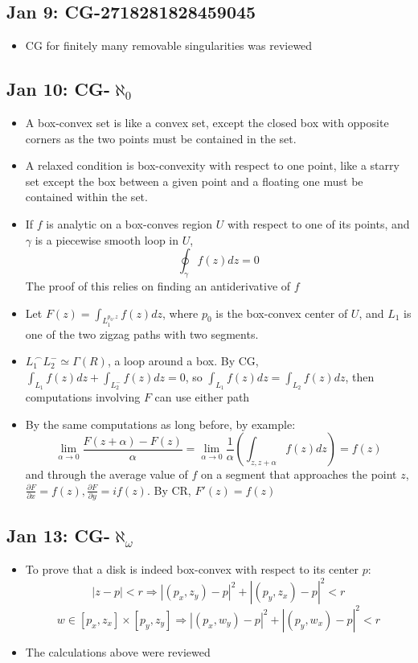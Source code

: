 \documentclass[10pt, oneside]{article}
\let\del\partial
\newcommand{\ltz}[1]{\lim_{#1 \rightarrow 0}}
\newcommand{\cat}{^{\,\smallfrown}}
\begin{document}
\subsection{Jan 9: CG-2718281828459045}
\begin{itemize}
    \item CG for finitely many removable singularities was reviewed
\end{itemize}

\subsection{Jan 10: CG-$\aleph_0$}
\begin{itemize}
    \item A box-convex set is like a convex set, except the closed box with opposite corners as the two points must be contained in the set.
    \item A relaxed condition is box-convexity with respect to one point, like a starry set except the box between a given point and a floating one must be contained within the set.
    \item If $f$ is analytic on a box-conves region $U$ with respect to one of its points, and $\gamma$ is a piecewise smooth loop in $U$,
        \[\oint_{\gamma} f(z) dz = 0\]
    The proof of this relies on finding an antiderivative of $f$
    \item Let $F(z) = \int_{L_1^{p_0,z}} f(z) dz$, where $p_0$ is the box-convex center of $U$, and $L_1$ is one of the two zigzag paths with two segments.
    \item $L_1 \cat L_2^- \simeq \Gamma(R)$, a loop around a box. By CG, $\int_{L_1} f(z) dz + \int_{L_2^-} f(z) dz = 0$, so $\int_{L_1} f(z) dz = \int_{L_2} f(z) dz$, then computations involving $F$ can use either path
    \item By the same computations as long before, by example:
        \[\ltz{\alpha} \frac{F(z+\alpha) - F(z)}{\alpha} = \ltz{\alpha} \frac{1}{\alpha} \left(\int_{z,z+\alpha} f(z) dz\right) = f(z)\]
    and through the average value of $f$ on a segment that approaches the point $z$, $\frac{\del F}{\del x} = f(z), \frac{\del F}{\del y} = if(z)$. By CR, $F'(z) = f(z)$
\end{itemize}

\subsection{Jan 13: CG-$\aleph_\omega$}
\begin{itemize}
    \item To prove that a disk is indeed box-convex with respect to its center $p$:
        \[|z - p| < r \Rightarrow |(p_x,z_y) - p|^2 + |(p_y,z_x) - p|^2 < r\]
        \[w \in [p_x,z_x] \times [p_y,z_y] \Rightarrow |(p_x,w_y) - p|^2 + |(p_y,w_x) - p|^2 < r\]
    \item The calculations above were reviewed
\end{itemize}
\end{document}
